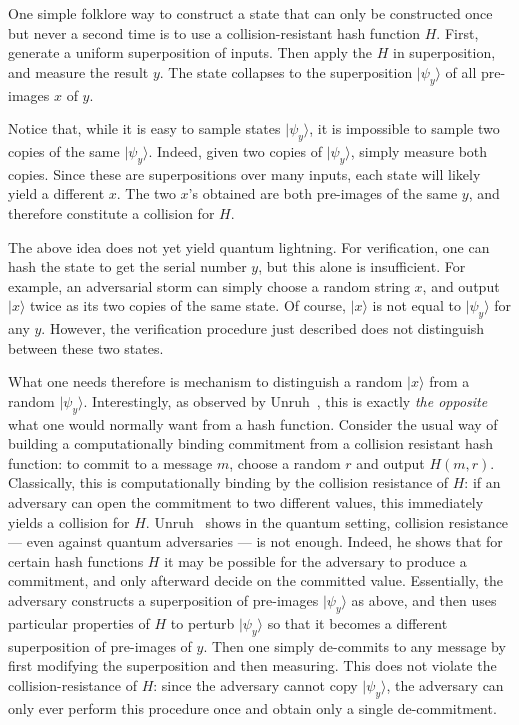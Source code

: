 One simple folklore way to construct a state that can only be constructed once but never a second time is to use a collision-resistant hash function $H$.  First, generate a uniform superposition of inputs.  Then apply the $H$ in superposition, and measure the result $y$.  The state collapses to the superposition $|\psi_y\rangle$ of all pre-images $x$ of $y$.  

Notice that, while it is easy to sample states $|\psi_y\rangle$, it is impossible to sample two copies of the same $|\psi_y\rangle$.  Indeed, given two copies of $|\psi_y\rangle$, simply measure both copies.  Since these are superpositions over many inputs, each state will likely yield a different $x$.  The two $x$'s obtained are both pre-images of the same $y$, and therefore constitute a collision for $H$.

The above idea does not yet yield quantum lightning.  For verification, one can hash the state to get the serial number $y$, but this alone is insufficient.  For example, an adversarial storm can simply choose a random string $x$, and output $|x\rangle$ twice as its two copies of the same state.  Of course, $|x\rangle$ is not equal to $|\psi_y\rangle$ for any $y$.  However, the verification procedure just described does not distinguish between these two states.  

What one needs therefore is mechanism to distinguish a random $|x\rangle$ from a random $|\psi_y\rangle$.  Interestingly, as observed by Unruh~\cite{EC:Unruh16}, this is exactly \emph{the opposite} what one would normally want from a hash function.  Consider the usual way of building a computationally binding commitment from a collision resistant hash function: to commit to a message $m$, choose a random $r$ and output $H(m,r)$.  Classically, this is computationally binding by the collision resistance of $H$: if an adversary can open the commitment to two different values, this immediately yields a collision for $H$.  Unruh~\cite{EC:Unruh16} shows in the quantum setting, collision resistance --- even against quantum adversaries --- is not enough.  Indeed, he shows that for certain hash functions $H$ it may be possible for the adversary to produce a commitment, and only afterward decide on the committed value.  Essentially, the adversary constructs a superposition of pre-images $|\psi_y\rangle$ as above, and then uses particular properties of $H$ to perturb $|\psi_y\rangle$ so that it becomes a different superposition of pre-images of $y$.   Then one simply de-commits to any message by first modifying the superposition and then measuring.  This does not violate the collision-resistance of $H$: since the adversary cannot copy $|\psi_y\rangle$, the adversary can only ever perform this procedure once and obtain only a single de-commitment.  

